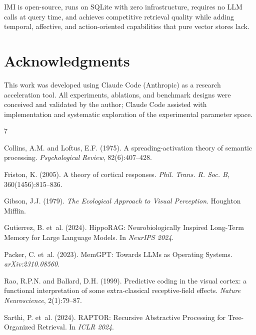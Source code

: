 \documentclass[11pt]{article}
\begin{document}
IMI is open-source, runs on SQLite with zero infrastructure, requires no LLM
calls at query time, and achieves competitive retrieval quality while adding
temporal, affective, and action-oriented capabilities that pure vector stores
lack.

\section*{Acknowledgments}

This work was developed using Claude Code (Anthropic) as a research
acceleration tool. All experiments, ablations, and benchmark designs were
conceived and validated by the author; Claude Code assisted with
implementation and systematic exploration of the experimental parameter space.



\begin{thebibliography}{7}

Collins, A.M. and Loftus, E.F. (1975).
\newblock A spreading-activation theory of semantic processing.
\newblock \emph{Psychological Review}, 82(6):407--428.

Friston, K. (2005).
\newblock A theory of cortical responses.
\newblock \emph{Phil. Trans. R. Soc. B}, 360(1456):815--836.

Gibson, J.J. (1979).
\newblock \emph{The Ecological Approach to Visual Perception}.
\newblock Houghton Mifflin.

Gutierrez, B. et~al. (2024).
\newblock HippoRAG: Neurobiologically Inspired Long-Term Memory for Large
  Language Models.
\newblock In \emph{NeurIPS 2024}.

Packer, C. et~al. (2023).
\newblock MemGPT: Towards LLMs as Operating Systems.
\newblock \emph{arXiv:2310.08560}.

Rao, R.P.N. and Ballard, D.H. (1999).
\newblock Predictive coding in the visual cortex: a functional interpretation
  of some extra-classical receptive-field effects.
\newblock \emph{Nature Neuroscience}, 2(1):79--87.

Sarthi, P. et~al. (2024).
\newblock RAPTOR: Recursive Abstractive Processing for Tree-Organized
  Retrieval.
\newblock In \emph{ICLR 2024}.

\end{thebibliography}
\end{document}
